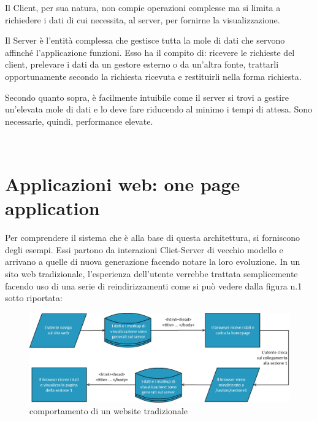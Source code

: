 Il Client, per sua natura, non compie operazioni complesse ma si limita a richiedere i dati di cui necessita, al server, per fornirne la visualizzazione. 

Il Server è l’entità complessa che gestisce tutta la mole di dati che servono affinché l’applicazione funzioni. Esso ha il compito di: ricevere le richieste del client, prelevare i dati da un gestore esterno o da un’altra fonte, trattarli opportunamente secondo la richiesta ricevuta e restituirli nella forma richiesta.

Secondo quanto sopra, è facilmente intuibile come il server si trovi a gestire un’elevata mole di dati e lo deve fare riducendo al minimo i tempi di attesa. Sono necessarie, quindi, performance elevate.

\newpage

 \section{Applicazioni web: one page application} %
\label{sec:applicazioni_web_one_page_application}

Per comprendere il sistema che è alla base di questa architettura, si forniscono degli esempi. Essi partono da interazioni Cliet-Server di vecchio modello e arrivano a quelle di nuova generazione facendo notare la loro evoluzione. In un sito web tradizionale, l’esperienza dell’utente verrebbe trattata semplicemente facendo uso di una serie di reindirizzamenti come si può vedere dalla figura n.1 sotto riportata:\\

\vspace{1cm}
\begin{figure}[htbp]
\begin{center}
\includegraphics[width=13cm]{contents/images/traditional_web_site}
\end{center}
\caption{comportamento di un website tradizionale}
\label{fig:flow_0}
\end{figure}
\vspace{1cm}

